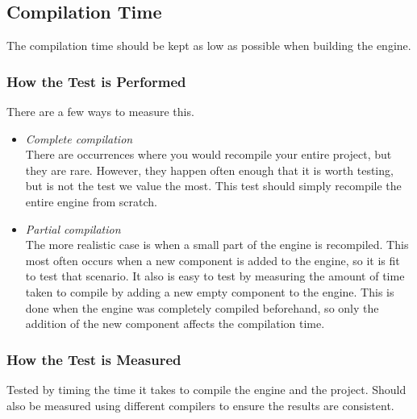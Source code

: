 \subsection{Compilation Time}
The compilation time should be kept as low as possible when building the engine.


\subsubsection*{How the Test is Performed}
There are a few ways to measure this.

\begin{itemize}

    \item \noindent\textit{Complete compilation}\\
    There are occurrences where you would recompile your entire project, but they are rare.
    However, they happen often enough that it is worth testing, but is not the test we value the most. This test should simply recompile the entire engine from scratch.

    \item \noindent\textit{Partial compilation}\\
    The more realistic case is when a small part of the engine is recompiled.
    This most often occurs when a new component is added to the engine, so it is fit to test that scenario.
    It also is easy to test by measuring the amount of time taken to compile by adding a new empty component to the engine.
    This is done when the engine was completely compiled beforehand, so only the addition of the new component affects the compilation time.

\end{itemize}

\subsubsection*{How the Test is Measured}
Tested by timing the time it takes to compile the engine and the project. 
Should also be measured using different compilers to ensure the results are consistent.
